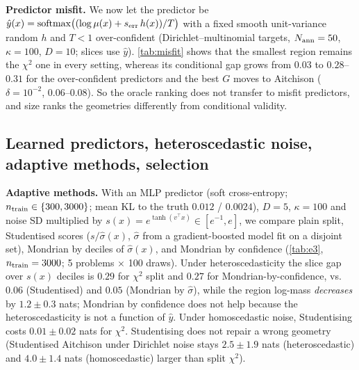 \documentclass{article}
\theoremstyle{plain}
\theoremstyle{remark}
\newcommand{\yh}{\hat y}
\begin{document}
\textbf{Predictor misfit.} We now let the predictor be $\yh(x)=\mathrm{softmax}\big((\log\mu(x)+s_{\rm err}\,h(x))/T\big)$ with a fixed smooth unit-variance random $h$ and $T<1$ over-confident (Dirichlet--multinomial targets, $N_{\rm ann}=50$, $\kappa=100$, $D=10$; slices use $\yh$). \cref{tab:misfit} shows that the smallest region remains the $\chi^2$ one in every setting, whereas its conditional gap grows from $0.03$ to $0.28$--$0.31$ for the over-confident predictors and the best $G$ moves to Aitchison ($\delta=10^{-2}$, $0.06$--$0.08$). So the oracle ranking does not transfer to misfit predictors, and size ranks the geometries differently from conditional validity.

\begin{table}[t]
\caption{Predictor misfit (E3b), $D=10$. $s_{\rm err}$: logit error scale, $T$: temperature of the predictor, $\mathrm{KL}_{\rm pred}$: mean $\mathrm{KL}(\mu\|\yh)$. Per setting, first line $G$ (max over confidence and min-component deciles; floor $\approx0.02$), second line $\Delta\log M_1$ (nats, relative to the best score); mean over 5 problems $\times$ 100 draws; bold: best.}\label{tab:misfit}
\centering\scriptsize\resizebox{\columnwidth}{!}{}
\end{table}

\subsection{Learned predictors, heteroscedastic noise, adaptive methods, selection}\label{sec:e3}
\textbf{Adaptive methods.} With an MLP predictor (soft cross-entropy; $n_{\rm train}\in\{300,3000\}$; mean KL to the truth $0.012$ / $0.0024$), $D{=}5$, $\kappa{=}100$ and noise SD multiplied by $s(x)=e^{\tanh(v^\top x)}\in[e^{-1},e]$, we compare plain split, Studentised scores ($s/\hat\sigma(x)$, $\hat\sigma$ from a gradient-boosted model fit on a disjoint set), Mondrian by deciles of $\hat\sigma(x)$, and Mondrian by confidence (\cref{tab:e3}, $n_{\rm train}=3000$; 5 problems $\times$ 100 draws). Under heteroscedasticity the slice gap over $s(x)$ deciles is $0.29$ for $\chi^2$ split and $0.27$ for Mondrian-by-confidence, vs.\ $0.06$ (Studentised) and $0.05$ (Mondrian by $\hat\sigma$), while the region log-mass \emph{decreases} by $1.2\pm0.3$ nats; Mondrian by confidence does not help because the heteroscedasticity is not a function of $\yh$. Under homoscedastic noise, Studentising costs $0.01\pm0.02$ nats for $\chi^2$. Studentising does not repair a wrong geometry (Studentised Aitchison under Dirichlet noise stays $2.5\pm1.9$ nats (heteroscedastic) and $4.0\pm1.4$ nats (homoscedastic) larger than split $\chi^2$).
\end{document}
